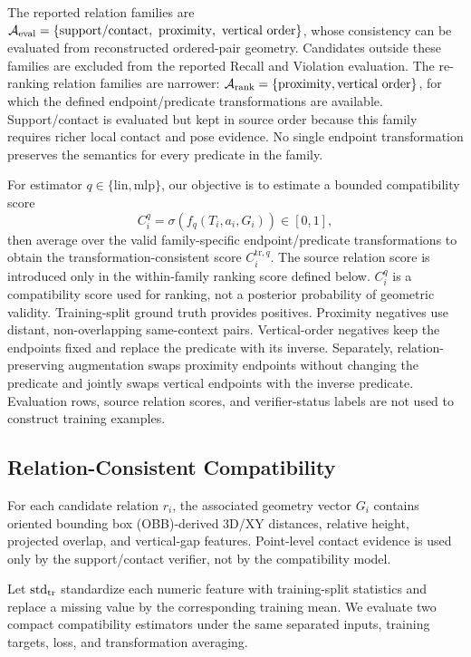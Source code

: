 The reported relation families are 
$\mathcal{A}_{\rm eval}=\{\mathrm{support/contact},\ \mathrm{proximity},\ \mathrm{vertical\ order}\}$, 
whose consistency can be evaluated from reconstructed ordered-pair geometry. Candidates outside these families are excluded from the reported Recall and Violation evaluation. The re-ranking relation families are narrower: $\mathcal A_{\rm rank}=\{\mathrm{proximity},\mathrm{vertical\ order}\}$, for which the defined endpoint/predicate transformations are available. Support/contact is evaluated but kept in source order because this family requires richer local contact and pose evidence. No single endpoint transformation preserves the semantics for every predicate in the family. 

For estimator $q\in\{\mathrm{lin},\mathrm{mlp}\}$, our objective is to estimate a bounded compatibility score
\begin{equation}
C_i^q=\sigma\!\left(f_q(T_i,a_i,G_i)\right)\in[0,1],
\end{equation}
then average over the valid family-specific endpoint/predicate transformations to obtain the transformation-consistent score $C_i^{\mathrm{tr},q}$. The source relation score is introduced only in the within-family ranking score defined below. $C_i^q$ is a compatibility score used for ranking, not a posterior probability of geometric validity. Training-split ground truth provides positives. Proximity negatives use distant, non-overlapping same-context pairs. Vertical-order negatives keep the endpoints fixed and replace the predicate with its inverse. Separately, relation-preserving augmentation swaps proximity endpoints without changing the predicate and jointly swaps vertical endpoints with the inverse predicate. Evaluation rows, source relation scores, and verifier-status labels are not used to construct training examples. 

\subsection{Relation-Consistent Compatibility}
\label{sec:Compatibility}
For each candidate relation $r_i$, the associated geometry vector $G_i$ contains oriented bounding box (OBB)-derived 3D/XY distances, relative height, projected overlap, and vertical-gap features. Point-level contact evidence is used only by the support/contact verifier, not by the compatibility model. 

Let $\operatorname{std}_{\rm tr}$ standardize each numeric feature with training-split statistics and replace a missing value by the corresponding training mean. We evaluate two compact compatibility estimators under the same separated inputs, training targets, loss, and transformation averaging. 
